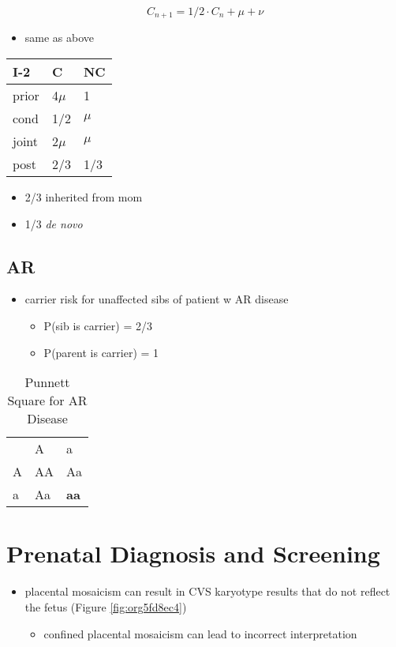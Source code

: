 \documentclass[12pt]{scrartcl}
\begin{document}
\[C_{n+1} = 1/2 \cdot C_n + \mu + \nu \]

\begin{itemize}
\item same as above
\end{itemize}

\begin{center}
\begin{tabular}{lll}
I-2 & C & NC\\
\hline
prior & 4\(\mu\) & 1\\
cond \footnotemark & 1/2 & \(\mu\)\\
joint & 2\(\mu\) & \(\mu\)\\
post & 2/3 & 1/3\\
\end{tabular}
\end{center}


\begin{itemize}
\item 2/3 inherited from mom
\item 1/3 \emph{de novo}
\end{itemize}

\subsection{AR}
\label{sec:org29f17d6}
\begin{itemize}
\item carrier risk for unaffected sibs of patient w AR disease
\begin{itemize}
\item P(sib is carrier) = 2/3
\item P(parent is carrier) = 1
\end{itemize}
\end{itemize}

\begin{table}[htbp]
\caption{\label{tab:org0a3c306}Punnett Square for AR Disease}
\centering
\begin{tabular}{lll}
 & A & a\\
A & AA & Aa\\
a & Aa & \textbf{aa}\\
\end{tabular}
\end{table}

\section{Prenatal Diagnosis and Screening}
\label{sec:orga41c201}
\begin{itemize}
\item placental mosaicism can result in CVS karyotype results that do not
reflect the fetus (Figure \ref{fig:org5fd8ec4})
\begin{itemize}
\item confined placental mosaicism can lead to incorrect interpretation
\end{itemize}
\end{itemize}
\end{document}
